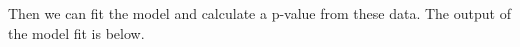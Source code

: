 Then we can fit the model and calculate a p-value from these data.  The output of the model fit is below.

\begin{knitrout}
\color{fgcolor}\begin{kframe}
\begin{alltt}
 \hlkwb{<-} 
\end{alltt}


{\ttfamily\noindent\bfseries{}}\end{kframe}
\end{knitrout}









